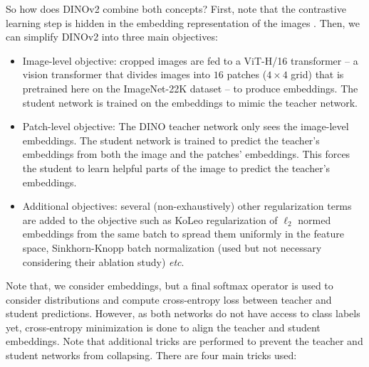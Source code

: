 So how does DINOv2 combine both concepts? First, note that the contrastive learning step is hidden in the embedding representation of the images \citep{caron2020unsupervised}. Then, we can simplify DINOv2 into three main objectives:
\begin{itemize}
    \item Image-level objective: cropped images are fed to a ViT-H/16 transformer -- a vision transformer that divides images into $16$ patches ($4\times 4$ grid) that is pretrained here on the ImageNet-22K dataset -- to produce embeddings. The student network is trained on the embeddings to mimic the teacher network.
    \item Patch-level objective: The DINO teacher network only sees the image-level embeddings. The student network is trained to predict the teacher's embeddings from both the image and the patches' embeddings. This forces the student to learn helpful parts of the image to predict the teacher's embeddings.
    \item Additional objectives: several (non-exhaustively) other regularization terms are added to the objective such as KoLeo regularization of $\ell_2$ normed embeddings from the same batch to spread them uniformly in the feature space, Sinkhorn-Knopp batch normalization (used but not necessary considering their ablation study) \emph{etc}.
\end{itemize}
Note that, we consider embeddings, but a final softmax operator is used to consider distributions and compute cross-entropy loss between teacher and student predictions. However, as both networks do not have access to class labels yet, cross-entropy minimization is done to align the teacher and student embeddings.
Note that additional tricks are performed to prevent the teacher and student networks from collapsing. There are four main tricks used:
